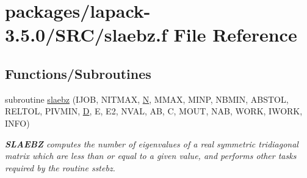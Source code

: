 \hypertarget{slaebz_8f}{}\section{packages/lapack-\/3.5.0/\+S\+R\+C/slaebz.f File Reference}
\label{slaebz_8f}
\subsection*{Functions/\+Subroutines}
\begin{DoxyCompactItemize}
\item 
subroutine \hyperlink{group__auxOTHERauxiliary_ga4f5045e3ec268a759d36fec562d6e481}{slaebz} (I\+J\+O\+B, N\+I\+T\+M\+A\+X, \hyperlink{polmisc_8c_a0240ac851181b84ac374872dc5434ee4}{N}, M\+M\+A\+X, M\+I\+N\+P, N\+B\+M\+I\+N, A\+B\+S\+T\+O\+L, R\+E\+L\+T\+O\+L, P\+I\+V\+M\+I\+N, \hyperlink{odrpack_8h_a7dae6ea403d00f3687f24a874e67d139}{D}, E, E2, N\+V\+A\+L, A\+B, C, M\+O\+U\+T, N\+A\+B, W\+O\+R\+K, I\+W\+O\+R\+K, I\+N\+F\+O)
\begin{DoxyCompactList}\small\item\em {\bfseries S\+L\+A\+E\+B\+Z} computes the number of eigenvalues of a real symmetric tridiagonal matrix which are less than or equal to a given value, and performs other tasks required by the routine sstebz. \end{DoxyCompactList}\end{DoxyCompactItemize}
